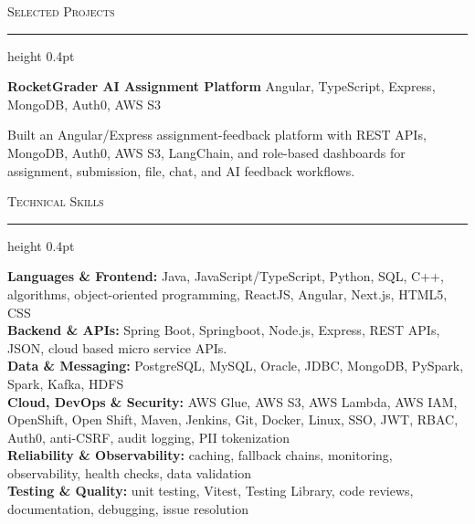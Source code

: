\documentclass[letterpaper,11pt]{article}
\newcommand{\resumesection}[1]{%
  \par\vspace{2pt}%
  {\large\scshape #1}\par\vspace{2pt}%
  \hrule height 0.4pt\vspace{2pt}%
}
\newcommand{\projectHeading}[2]{
  \textbf{#1} \hfill #2
}
\begin{document}
\resumesection{Selected Projects}
\projectHeading{RocketGrader AI Assignment Platform}{Angular, TypeScript, Express, MongoDB, Auth0, AWS S3}
\begin{tightitemize}
  \item Built an Angular/Express assignment-feedback platform with REST APIs, MongoDB, Auth0, AWS S3, LangChain, and role-based dashboards for assignment, submission, file, chat, and AI feedback workflows.
\end{tightitemize}

\resumesection{Technical Skills}
\textbf{Languages \& Frontend:} Java, JavaScript/TypeScript, Python, SQL, C++, algorithms, object-oriented programming, ReactJS, Angular, Next.js, HTML5, CSS\\
\textbf{Backend \& APIs:} Spring Boot, Springboot, Node.js, Express, REST APIs, JSON, cloud based micro service APIs.\\
\textbf{Data \& Messaging:} PostgreSQL, MySQL, Oracle, JDBC, MongoDB, PySpark, Spark, Kafka, HDFS\\
\textbf{Cloud, DevOps \& Security:} AWS Glue, AWS S3, AWS Lambda, AWS IAM, OpenShift, Open Shift, Maven, Jenkins, Git, Docker, Linux, SSO, JWT, RBAC, Auth0, anti-CSRF, audit logging, PII tokenization\\
\textbf{Reliability \& Observability:} caching, fallback chains, monitoring, observability, health checks, data validation\\
\textbf{Testing \& Quality:} unit testing, Vitest, Testing Library, code reviews, documentation, debugging, issue resolution
\end{document}
